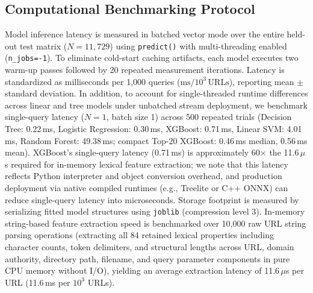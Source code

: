 \subsection{Computational Benchmarking Protocol}
Model inference latency is measured in batched vector mode over the entire held-out test matrix ($N=11,729$) using \texttt{predict()} with multi-threading enabled (\texttt{n\_jobs=-1}). To eliminate cold-start caching artifacts, each model executes two warm-up passes followed by 20 repeated measurement iterations. Latency is standardized as milliseconds per 1,000 queries ($\text{ms} / 10^3\,\text{URLs}$), reporting mean $\pm$ standard deviation. In addition, to account for single-threaded runtime differences across linear and tree models under unbatched stream deployment, we benchmark single-query latency ($N=1$, batch size 1) across 500 repeated trials (Decision Tree: 0.22\,ms, Logistic Regression: 0.30\,ms, XGBoost: 0.71\,ms, Linear SVM: 4.01\,ms, Random Forest: 49.38\,ms; compact Top-20 XGBoost: 0.46\,ms median, 0.56\,ms mean). XGBoost's single-query latency (0.71\,ms) is approximately 60$\times$ the 11.6\,$\mu$s required for in-memory lexical feature extraction; we note that this latency reflects Python interpreter and object conversion overhead, and production deployment via native compiled runtimes (e.g., Treelite or C++ ONNX) can reduce single-query latency into microseconds. Storage footprint is measured by serializing fitted model structures using \texttt{joblib} (compression level 3). In-memory string-based feature extraction speed is benchmarked over 10,000 raw URL string parsing operations (extracting all 84 retained lexical properties including character counts, token delimiters, and structural lengths across URL, domain authority, directory path, filename, and query parameter components in pure CPU memory without I/O), yielding an average extraction latency of 11.6\,$\mu$s per URL (11.6\,ms per $10^3$ URLs).

